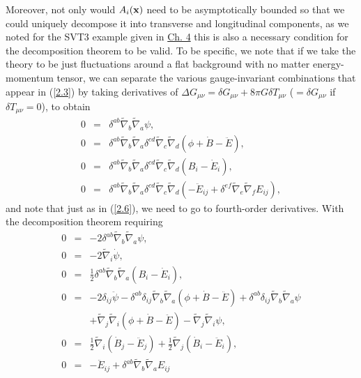 Moreover, not only would  $A_i({\bf x})$ need to be asymptotically bounded so that we could uniquely decompose it into transverse and longitudinal components, as we noted for the SVT3 example given in \hyperref[c:decomposition_theorem]{Ch. 4} this is also a necessary condition for the decomposition theorem to be valid. To be specific, we note that if we take the theory to be just fluctuations around a flat background with no matter energy-momentum tensor, we can separate the various gauge-invariant combinations that appear in (\ref{2.3}) by taking derivatives of $\Delta G_{\mu\nu}=\delta G_{\mu\nu}+8\pi G \delta T_{\mu\nu}$ ($=\delta G_{\mu\nu}$ if $\delta T_{\mu\nu}=0$), to obtain
%
\begin{eqnarray}
0&=&\delta^{ab} \tilde{\nabla}_{b}\tilde{\nabla}_{a}\psi,
\nonumber\\
0&=&\delta^{ab} \tilde{\nabla}_{b}\tilde{\nabla}_{a} \delta^{cd} \tilde{\nabla}_{c}\tilde{\nabla}_{d}(\phi+\dot{B}  -\ddot{E}),
\nonumber\\
0&=&\delta^{ab} \tilde{\nabla}_{b}\tilde{\nabla}_{a} \delta^{cd} \tilde{\nabla}_{c}\tilde{\nabla}_{d}(B_i-\dot{E}_i),
\nonumber\\
0&=&\delta^{ab} \tilde{\nabla}_{b}\tilde{\nabla}_{a} \delta^{cd} \tilde{\nabla}_{c}\tilde{\nabla}_{d}(-\ddot{E}_{ij}+\delta^{ef} \tilde{\nabla}_{e}\tilde{\nabla}_{f}E_{ij}),
\label{2.19}
\end{eqnarray}
%
and note that just as in (\ref{2.6}), we need to go to fourth-order derivatives. With the decomposition theorem requiring
%
\begin{eqnarray}
0&=&- 2 \delta^{ab} \tilde{\nabla}_{b}\tilde{\nabla}_{a}\psi,
\nonumber\\
0&=&- 2 \tilde{\nabla}_{i}\dot{\psi},
\nonumber\\
0&=&\tfrac{1}{2} \delta^{ab} \tilde{\nabla}_{b}\tilde{\nabla}_{a}(B_{i} -  \dot{E}_{i}),
\nonumber\\
0&=&-2 \delta_{ij} \ddot{\psi} -  \delta^{ab} \delta_{ij} \tilde{\nabla}_{b}\tilde{\nabla}_{a}(\phi+\dot{B}  -\ddot{E})+ \delta^{ab} \delta_{ij} \tilde{\nabla}_{b}\tilde{\nabla}_{a}\psi 
\nonumber\\
&& +\tilde{\nabla}_{j}\tilde{\nabla}_{i}(\phi+\dot{B} -  \ddot{E}) - \tilde{\nabla}_{j}\tilde{\nabla}_{i}\psi,
\nonumber\\
0&=&\tfrac{1}{2} \tilde{\nabla}_{i}(\dot{B}_{j} - \ddot{E}_{j}) + \tfrac{1}{2} \tilde{\nabla}_{j}(\dot{B}_{i} 
- \ddot{E}_{i}),
\nonumber\\
0&=&- \ddot{E}_{ij} + \delta^{ab} \tilde{\nabla}_{b}\tilde{\nabla}_{a}E_{ij}
\label{2.20}
\end{eqnarray}

